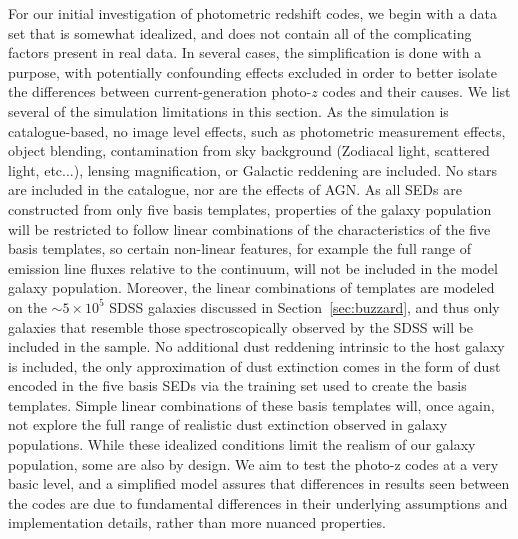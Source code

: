 For our initial investigation of photometric redshift codes, we begin with a data set that is somewhat idealized, and does not contain all of the complicating factors present in real data.
In several cases, the simplification is done with a purpose, with potentially confounding effects excluded in order to better isolate the differences between current-generation photo-$z$ codes and their causes.
We list several of the simulation limitations in this section.
As the simulation is catalogue-based, no image level effects, such as photometric measurement effects, object blending, contamination from sky background (Zodiacal light, scattered light, etc...), lensing magnification, or Galactic reddening are included.  No stars are included in the catalogue, nor are the effects of AGN.
As all SEDs are constructed from only five basis templates, properties of the galaxy population will be restricted to follow linear combinations of the characteristics of the five basis templates, so certain non-linear features, for example the full range of emission line fluxes relative to the continuum, will not be included in the model galaxy population.
Moreover, the linear combinations of templates are modeled on the $\sim5\times 10^{5}$ SDSS galaxies discussed in Section~\ref{sec:buzzard}, and thus only galaxies that resemble those spectroscopically observed by the SDSS will be included in the sample.
No additional dust reddening intrinsic to the host galaxy is included, the only approximation of dust extinction comes in the form of dust encoded in the five basis SEDs via the training set used to create the basis templates.
Simple linear combinations of these basis templates will, once again, not explore the full range of realistic dust extinction observed in galaxy populations.
While these idealized conditions limit the realism of our galaxy population, some are also by design.
We aim to test the photo-z codes at a very basic level, and a simplified model assures that differences in results seen between the codes are due to fundamental differences in their underlying assumptions and implementation details, rather than more nuanced properties.
